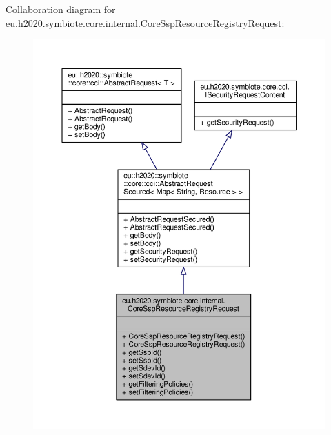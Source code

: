 Collaboration diagram for eu.\+h2020.\+symbiote.\+core.\+internal.\+Core\+Ssp\+Resource\+Registry\+Request\+:\nopagebreak
\begin{figure}[H]
\begin{center}
\leavevmode
\includegraphics[width=350pt]{classeu_1_1h2020_1_1symbiote_1_1core_1_1internal_1_1CoreSspResourceRegistryRequest__coll__graph}
\end{center}
\end{figure}
